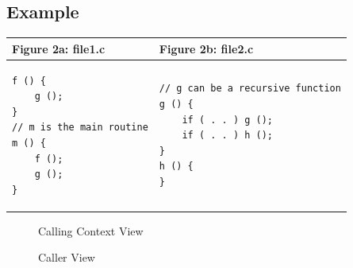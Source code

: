 
\subsection{Example}

\begin{center}
\begin{tabular}{|p{3in}|p{3in}|}\hline
\textbf{Figure 2a: file1.c} & \textbf{Figure 2b: file2.c} \\\hline
\begin{verbatim}
f () {
 	g ();
}
// m is the main routine
m () {
 	f ();
 	g ();
}
\end{verbatim} &
\begin{verbatim}
// g can be a recursive function
g () {
	if ( . . ) g ();
	if ( . . ) h ();
}
h () {
}
\end{verbatim}\\\hline
\end{tabular}
\end{center}

\begin{figure}[t]
\caption{Calling Context View}
\label{fig:cct}
\end{figure}

\begin{figure}
\caption{Caller View}
\label{fig:callers-tree}
\end{figure}

